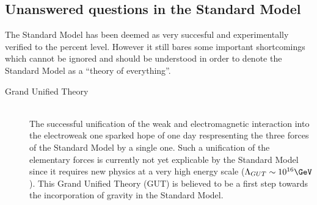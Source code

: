 \subsection{Unanswered questions in the Standard Model} \label{sec::QuestionsSM}
The Standard Model has been deemed as very succesful and experimentally verified to the percent level. However it still bares some important shortcomings which cannot be ignored and should be understood in order to denote the Standard Model as a ``theory of everything''. 

\begin{myindentpar}
  \begin{description}
    \item[Grand Unified Theory] \hfill \\
    The successful unification of the weak and electromagnetic interaction into the electroweak one sparked hope of one day respresenting the three forces of the Standard Model by a single one.
    Such a unification of the elementary forces is currently not yet explicable by the Standard Model since it requires new physics at a very high energy scale ($\Lambda_{GUT} \sim 10^{16} \GeV$).
    This Grand Unified Theory (GUT) is believed to be a first step towards the incorporation of gravity in the Standard Model.
    

\end{description}
\end{myindentpar}
